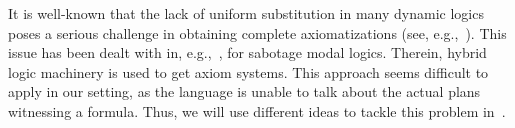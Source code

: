 It is well-known that the lack of uniform substitution in many dynamic logics poses a serious challenge in obtaining complete axiomatizations (see, e.g.,~\cite{HoHoIc11}). This issue has been dealt with in, e.g.,~\cite{BenthemMZ2022,BenthemLSY22}, for sabotage modal logics.
Therein, hybrid logic machinery is used to get axiom systems. This approach seems difficult to apply in our setting, as the language is unable to talk about the actual plans witnessing a formula. Thus, we will use different ideas to tackle this problem in~.

%

%
%
%
%

